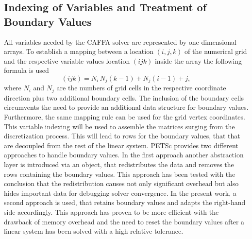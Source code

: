 \subsection{Indexing of Variables and Treatment of Boundary Values}

All variables needed by the CAFFA solver are represented by one-dimensional arrays. To establish a mapping between a location \((i,j,k)\) of the numerical grid and the respective variable values location \((ijk)\) inside the array the following formula is used
\begin{displaymath}
  (ijk) = N_i \, N_j \left(k - 1\right) + N_j \left(i - 1\right) + j,
\end{displaymath}
where \(N_i\) and \(N_j\) are the numbers of grid cells in the respective coordinate direction plus two additional boundary cells. The inclusion of the boundary cells circumvents the need to provide an additional data structure for boundary values. Furthermore, the same mapping rule can be used for the grid vertex coordinates. This variable indexing will be used to assemble the matrices surging from the discretization process. This will lead to rows for the boundary values, that that are decoupled from the rest of the linear system. PETSc provides two different approaches to handle boundary values. In the first approach another abstraction layer is introduced via an object, that redistributes the data and removes the rows containing the boundary values. This approach has been tested with the conclusion that the redistribution causes not only significant overhead but also hides important data for debugging solver convergence. In the present work, a second approach is used, that retains boundary values and adapts the right-hand side accordingly. This approach has proven to be more efficient with the drawback of memory overhead and the need to reset the boundary values after a linear system has been solved with a high relative tolerance.

